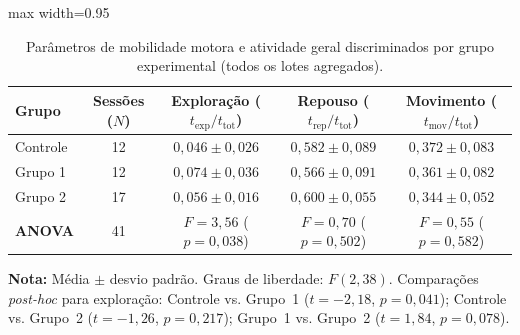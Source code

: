 \begin{table}[tbp]
    \centering
    \small
    \setlength{\tabcolsep}{4.5pt}
    \caption{Parâmetros de mobilidade motora e atividade geral discriminados por grupo experimental (todos os lotes agregados).}
    \label{tab:estatistica_grupos_movimento}
    \begin{adjustbox}{max width=0.95\textwidth}
        \begin{tabular}{lcccc}
            \toprule
            \textbf{Grupo} & \textbf{Sessões ($N$)} & \textbf{Exploração ($t_{\text{exp}}/t_{\text{tot}}$)} & \textbf{Repouso ($t_{\text{rep}}/t_{\text{tot}}$)} & \textbf{Movimento ($t_{\text{mov}}/t_{\text{tot}}$)} \\
            \midrule
            Controle       & 12                     & $0{,}046 \pm 0{,}026$                                 & $0{,}582 \pm 0{,}089$                              & $0{,}372 \pm 0{,}083$                                \\
            Grupo 1        & 12                     & $0{,}074 \pm 0{,}036$                                 & $0{,}566 \pm 0{,}091$                              & $0{,}361 \pm 0{,}082$                                \\
            Grupo 2        & 17                     & $0{,}056 \pm 0{,}016$                                 & $0{,}600 \pm 0{,}055$                              & $0{,}344 \pm 0{,}052$                                \\
            \midrule
            \textbf{ANOVA} & 41                     & $F = 3{,}56$ ($p = 0{,}038$)                          & $F = 0{,}70$ ($p = 0{,}502$)                       & $F = 0{,}55$ ($p = 0{,}582$)                         \\
            \bottomrule
        \end{tabular}
    \end{adjustbox}
    \vspace{0.2em}
    \begin{minipage}{0.95\textwidth}
        \footnotesize \textbf{Nota:} Média $\pm$ desvio padrão. Graus de liberdade: $F(2, 38)$. Comparações \emph{post-hoc} para exploração: Controle vs. Grupo~1 ($t = -2{,}18$, $p = 0{,}041$); Controle vs. Grupo~2 ($t = -1{,}26$, $p = 0{,}217$); Grupo~1 vs. Grupo~2 ($t = 1{,}84$, $p = 0{,}078$).
    \end{minipage}
\end{table}
